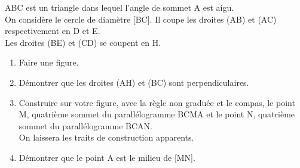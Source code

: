 \begin{exercice}[CRPRE 2008 G3] %
   ABC est un triangle dans lequel l'angle de sommet A est aigu. \\
   On considère le cercle de diamètre [BC]. Il coupe les droites (AB) et (AC) respectivement en D et E. \\
   Les droites (BE) et (CD) se coupent en H.
   \begin{enumerate}
      \item Faire une figure.
      \item Démontrer que les droites (AH) et (BC) sont perpendiculaires.
      \item Construire sur votre figure, avec la règle non graduée et le compas, le point M, quatrième sommet du parallélogramme BCMA et le point N, quatrième sommet du parallélogramme BCAN. \\
      On laissera les traits de construction apparents.
      \item Démontrer que le point A est le milieu de [MN].
   \end{enumerate}
\end{exercice}

